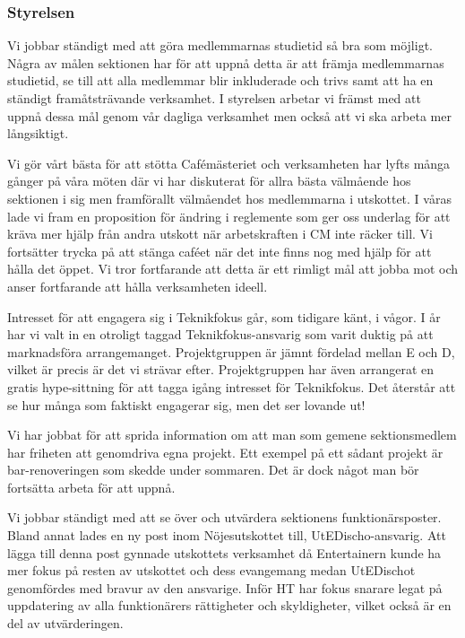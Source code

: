 \documentclass[../_main/handlingar.tex]{subfiles}
\begin{document}

\subsubsection*{Styrelsen}
Vi jobbar ständigt med att göra medlemmarnas studietid så bra som möjligt. Några av målen sektionen har för att uppnå detta är att främja medlemmarnas studietid, se till att alla medlemmar blir inkluderade och trivs samt att ha en ständigt framåtsträvande verksamhet. 
I styrelsen arbetar vi främst med att uppnå dessa mål genom vår dagliga verksamhet men också att vi ska arbeta mer långsiktigt.

Vi gör vårt bästa för att stötta Cafémästeriet och verksamheten har lyfts många gånger på våra möten där vi har diskuterat för allra bästa välmående hos sektionen i sig men framförallt välmåendet hos medlemmarna i utskottet. I våras lade vi fram en proposition för ändring i reglemente som ger oss underlag för att kräva mer hjälp från andra utskott när arbetskraften i CM inte räcker till. Vi fortsätter trycka på att stänga caféet när det inte finns nog med hjälp för att hålla det öppet. Vi tror fortfarande att detta är ett rimligt mål att jobba mot och anser fortfarande att hålla verksamheten ideell.

Intresset för att engagera sig i Teknikfokus går, som tidigare känt, i vågor. I år har vi valt in en otroligt taggad Teknikfokus-ansvarig som varit duktig på att marknadsföra arrangemanget. Projektgruppen är jämnt fördelad mellan E och D, vilket är precis är det vi strävar efter. Projektgruppen har även arrangerat en gratis hype-sittning för att tagga igång intresset för Teknikfokus. Det återstår att se hur många som faktiskt engagerar sig, men det ser lovande ut!

Vi har jobbat för att sprida information om att man som gemene sektionsmedlem har friheten att genomdriva egna projekt. Ett exempel på ett sådant projekt är bar-renoveringen som skedde under sommaren. Det är dock något man bör fortsätta arbeta för att uppnå.

Vi jobbar ständigt med att se över och utvärdera sektionens funktionärsposter. Bland annat lades en ny post inom Nöjesutskottet till, UtEDischo-ansvarig. Att lägga till denna post gynnade utskottets verksamhet då Entertainern kunde ha mer fokus på resten av utskottet och dess evangemang medan UtEDischot genomfördes med bravur av den ansvarige. Inför HT har fokus snarare legat på uppdatering av alla funktionärers rättigheter och skyldigheter, vilket också är en del av utvärderingen.
\end{document}
